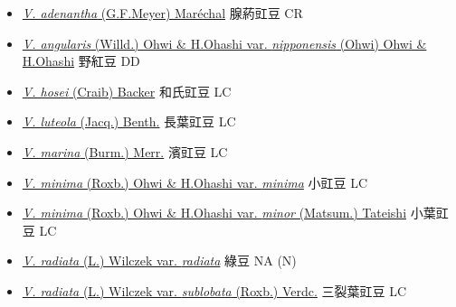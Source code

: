 \begin{itemize}
  \begin{itemize}
        \item[] \href{http://www.theplantlist.org/tpl1.1/search?q=Vigna+adenantha}{\textit{V. adenantha} (G.F.Meyer) Maréchal}   腺葯豇豆   CR
        \item[] \href{http://www.theplantlist.org/tpl1.1/search?q=Vigna+angularis+var.+nipponensis}{\textit{V. angularis} (Willd.) Ohwi \& H.Ohashi var. \textit{nipponensis} (Ohwi) Ohwi \& H.Ohashi}   野紅豆   DD
        \item[] \href{http://www.theplantlist.org/tpl1.1/search?q=Vigna+hosei}{\textit{V. hosei} (Craib) Backer}   和氏豇豆   LC
        \item[] \href{http://www.theplantlist.org/tpl1.1/search?q=Vigna+luteola}{\textit{V. luteola} (Jacq.) Benth.}   長葉豇豆   LC
        \item[] \href{http://www.theplantlist.org/tpl1.1/search?q=Vigna+marina}{\textit{V. marina} (Burm.) Merr.}   濱豇豆   LC
        \item[] \href{http://www.theplantlist.org/tpl1.1/search?q=Vigna+minima+var.+minima}{\textit{V. minima} (Roxb.) Ohwi \& H.Ohashi var. \textit{minima}}   小豇豆   LC
        \item[] \href{http://www.theplantlist.org/tpl1.1/search?q=Vigna+minima+var.+minor}{\textit{V. minima} (Roxb.) Ohwi \& H.Ohashi var. \textit{minor} (Matsum.) Tateishi}   小葉豇豆   LC
        \item[] \href{http://www.theplantlist.org/tpl1.1/search?q=Vigna+radiata+var.+radiata}{\textit{V. radiata} (L.) Wilczek var. \textit{radiata}}   綠豆   NA (N)
        \item[] \href{http://www.theplantlist.org/tpl1.1/search?q=Vigna+radiata+var.+sublobata}{\textit{V. radiata} (L.) Wilczek var. \textit{sublobata} (Roxb.) Verdc.}   三裂葉豇豆   LC

\end{itemize}
\end{itemize}
